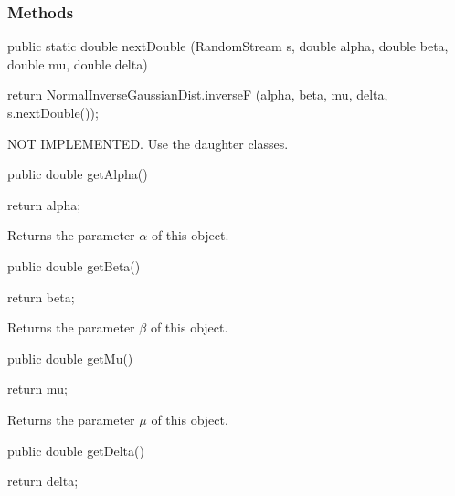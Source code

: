 \subsubsection* {Methods}
\begin{code}

   public static double nextDouble (RandomStream s, double alpha,
                                    double beta, double mu, double delta)\begin{hide} {
      return NormalInverseGaussianDist.inverseF (alpha, beta, mu, delta,
                                                 s.nextDouble());
   }\end{hide}
\end{code}
\begin{tabb}
 NOT IMPLEMENTED. Use the daughter classes.
\end{tabb}
\begin{code}

   public double getAlpha()\begin{hide} {
      return alpha;
   }\end{hide}
\end{code}
 \begin{tabb} Returns the parameter $\alpha$ of this object.
 \end{tabb}
\begin{code}

   public double getBeta()\begin{hide} {
      return beta;
   }\end{hide}
\end{code}
 \begin{tabb} Returns the parameter $\beta$ of this object.
 \end{tabb}
\begin{code}

   public double getMu()\begin{hide} {
      return mu;
   }\end{hide}
\end{code}
 \begin{tabb} Returns the parameter $\mu$ of this object.
 \end{tabb}
\begin{code}

   public double getDelta()\begin{hide} {
      return delta;
   }\end{hide}
\end{code}
